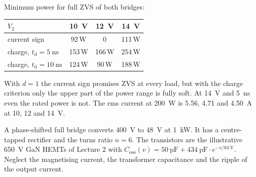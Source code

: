 \begin{solutionblock}
	Minimum power for full ZVS of both bridges:
	\begin{center}
		\begin{tabular}{|l|c|c|c|}
			\hline
			$V_2$                                        & \SI{10}{\volt} & \SI{12}{\volt} & \SI{14}{\volt} \\
			\hline
			current sign                                 & 92\,W          & 0              & 111\,W         \\
			charge, $t_\mathrm{d}=\SI{5}{\nano\second}$  & 153\,W         & 166\,W         & 254\,W         \\
			charge, $t_\mathrm{d}=\SI{10}{\nano\second}$ & 124\,W         & 90\,W          & 188\,W         \\
			\hline
		\end{tabular}
		\label{tab:ex08_dab}
	\end{center}
	With $d=1$ the current sign promises ZVS at every load, but with the charge criterion only the upper part of the power range is fully soft. At \SI{14}{\volt} and \SI{5}{\nano\second} even the rated power is not. The rms current at \SI{200}{\watt} is 5.56, 4.71 and \SI{4.50}{\ampere} at 10, 12 and \SI{14}{\volt}.
\end{solutionblock}



A phase-shifted full bridge converts \SI{400}{\volt} to \SI{48}{\volt} at \SI{1}{\kilo\watt}. It has a centre-tapped rectifier and the turns ratio $n=6$. The transistors are the illustrative \SI{650}{\volt} GaN HEMTs of Lecture 2 with $C_\mathrm{oss}(v)=\SI{50}{\pico\farad}+\SI{434}{\pico\farad}\cdot e^{-v/\SI{83}{\volt}}$. Neglect the magnetising current, the transformer capacitance and the ripple of the output current.


